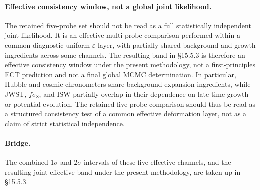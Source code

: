 \paragraph{Effective consistency window, not a global joint likelihood.}
The retained five-probe set should not be read as a full statistically
independent joint likelihood. It is an effective multi-probe
comparison performed within a common diagnostic uniform-$\varepsilon$
layer, with partially shared background and growth ingredients across
some channels. The resulting band in \S15.5.3 is therefore an
effective consistency window under the present methodology, not a
first-principles ECT prediction and not a final global MCMC
determination. In particular, Hubble and cosmic chronometers share
background-expansion ingredients, while JWST, $f\sigma_8$, and ISW
partially overlap in their dependence on late-time growth or potential
evolution. The retained five-probe comparison should thus be read as a
structured consistency test of a common effective deformation layer,
not as a claim of strict statistical independence.

\paragraph{Bridge.}
The combined $1\sigma$ and $2\sigma$ intervals of these five effective
channels, and the resulting joint effective band under the present
methodology, are taken up in \S15.5.3.

